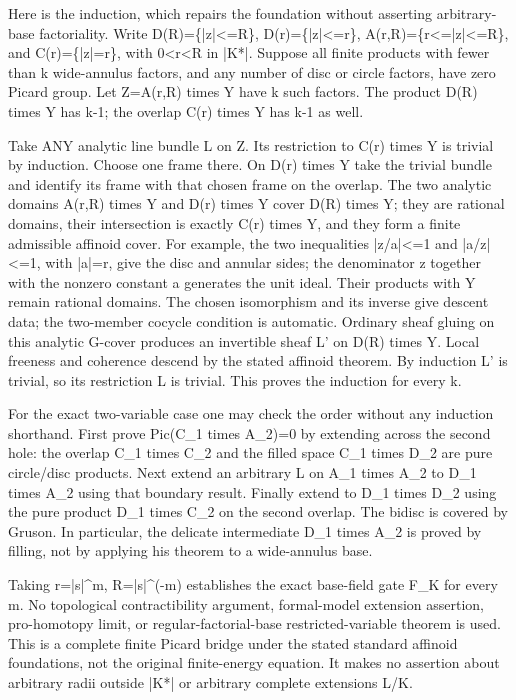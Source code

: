 \documentclass[11pt]{article}
\begin{document}
Here is the induction, which repairs the foundation without asserting arbitrary-base factoriality. Write D(R)=\{|z|<=R\}, D(r)=\{|z|<=r\}, A(r,R)=\{r<=|z|<=R\}, and C(r)=\{|z|=r\}, with 0<r<R in |K*|. Suppose all finite products with fewer than k wide-annulus factors, and any number of disc or circle factors, have zero Picard group. Let Z=A(r,R) times Y have k such factors. The product D(R) times Y has k-1; the overlap C(r) times Y has k-1 as well.

Take ANY analytic line bundle L on Z. Its restriction to C(r) times Y is trivial by induction. Choose one frame there. On D(r) times Y take the trivial bundle and identify its frame with that chosen frame on the overlap. The two analytic domains A(r,R) times Y and D(r) times Y cover D(R) times Y; they are rational domains, their intersection is exactly C(r) times Y, and they form a finite admissible affinoid cover. For example, the two inequalities |z/a|<=1 and |a/z|<=1, with |a|=r, give the disc and annular sides; the denominator z together with the nonzero constant a generates the unit ideal. Their products with Y remain rational domains. The chosen isomorphism and its inverse give descent data; the two-member cocycle condition is automatic. Ordinary sheaf gluing on this analytic G-cover produces an invertible sheaf L' on D(R) times Y. Local freeness and coherence descend by the stated affinoid theorem. By induction L' is trivial, so its restriction L is trivial. This proves the induction for every k.

For the exact two-variable case one may check the order without any induction shorthand. First prove Pic(C\_1 times A\_2)=0 by extending across the second hole: the overlap C\_1 times C\_2 and the filled space C\_1 times D\_2 are pure circle/disc products. Next extend an arbitrary L on A\_1 times A\_2 to D\_1 times A\_2 using that boundary result. Finally extend to D\_1 times D\_2 using the pure product D\_1 times C\_2 on the second overlap. The bidisc is covered by Gruson. In particular, the delicate intermediate D\_1 times A\_2 is proved by filling, not by applying his theorem to a wide-annulus base.

Taking r=|s|\textasciicircum{}m, R=|s|\textasciicircum{}(-m) establishes the exact base-field gate F\_K for every m. No topological contractibility argument, formal-model extension assertion, pro-homotopy limit, or regular-factorial-base restricted-variable theorem is used. This is a complete finite Picard bridge under the stated standard affinoid foundations, not the original finite-energy equation. It makes no assertion about arbitrary radii outside |K*| or arbitrary complete extensions L/K.
\end{document}
